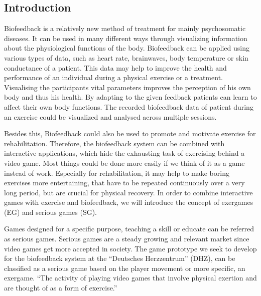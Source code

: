 \begin{multicols}{2}

\section{Introduction}

Biofeedback is a relatively new method of treatment for mainly psychosomatic diseases. It can be used in many different ways through visualizing information about the physiological functions of the body. Biofeedback can be applied using various types of data, such as heart rate, brainwaves, body temperature or skin conductance of a patient. This data may help to improve the health and performance of an individual during a physical exercise or a treatment. Visualising the participants vital parameters improves the perception of his own body and thus his health. By adapting to the given feedback patients can learn to affect their own body functions.\cite{BF2007} The recorded biofeedback data of patient during an exercise could be visualized and analysed across multiple sessions. 

Besides this, Biofeedback could also be used to promote and motivate exercise for rehabilitation. Therefore, the biofeedback system can be combined with interactive applications, which hide the exhausting task of exercising behind a video game. Most things could be done more easily if we think of it as a game instead of work. Especially for rehabilitation, it may help to make boring exercises more entertaining, that have to be repeated continuously over a very long period, but are crucial for physical recovery. In order to combine interactive games with
exercise and biofeedback, we will introduce the concept of exergames (EG) and serious games (SG).

Games designed for a specific purpose, teaching a skill or educate can be referred as serious games. \cite{Derryberry} Serious games are a steady growing and relevant market since video games get more accepted in society. \cite{SGIndustry} The game prototype we seek to develop for the biofeedback system at the “Deutsches Herzzentrum” (DHZ), can be classified as a serious game based on the player movement or more specific, an exergame. “The activity of playing video games that involve physical exertion and are thought of as a form of exercise.” %


\end{multicols}
